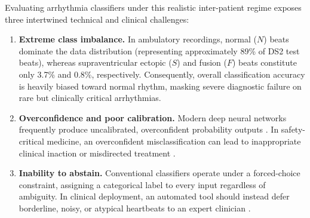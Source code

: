 \documentclass[conference]{IEEEtran}
\begin{document}
Evaluating arrhythmia classifiers under this realistic inter-patient regime exposes three intertwined technical and clinical challenges:
\begin{enumerate}
    \item \textbf{Extreme class imbalance.} In ambulatory recordings, normal ($N$) beats dominate the data distribution (representing approximately 89\% of DS2 test beats), whereas supraventricular ectopic ($S$) and fusion ($F$) beats constitute only 3.7\% and 0.8\%, respectively. Consequently, overall classification accuracy is heavily biased toward normal rhythm, masking severe diagnostic failure on rare but clinically critical arrhythmias.
    \item \textbf{Overconfidence and poor calibration.} Modern deep neural networks frequently produce uncalibrated, overconfident probability outputs \cite{b9}. In safety-critical medicine, an overconfident misclassification can lead to inappropriate clinical inaction or misdirected treatment \cite{b18}.
    \item \textbf{Inability to abstain.} Conventional classifiers operate under a forced-choice constraint, assigning a categorical label to every input regardless of ambiguity. In clinical deployment, an automated tool should instead defer borderline, noisy, or atypical heartbeats to an expert clinician \cite{b17,b20}.
\end{enumerate}
\end{document}
